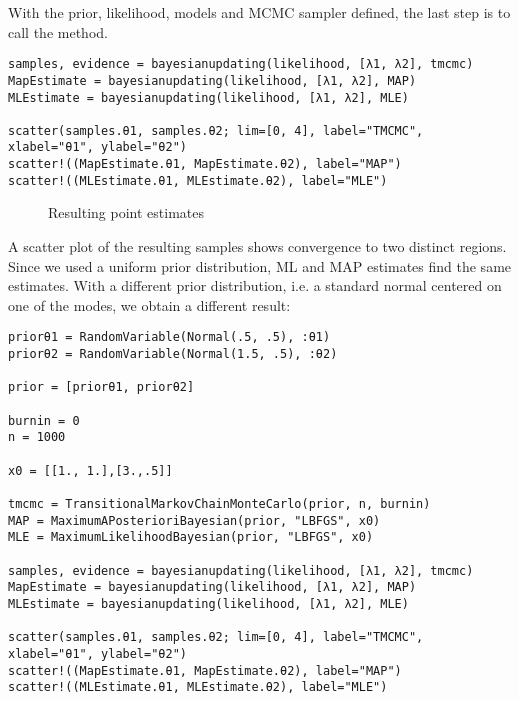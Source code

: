 With the prior, likelihood, models and  MCMC sampler defined, the last step is to call the  method.




\begin{verbatim}
samples, evidence = bayesianupdating(likelihood, [λ1, λ2], tmcmc)
MapEstimate = bayesianupdating(likelihood, [λ1, λ2], MAP)
MLEstimate = bayesianupdating(likelihood, [λ1, λ2], MLE)

scatter(samples.θ1, samples.θ2; lim=[0, 4], label="TMCMC", xlabel="θ1", ylabel="θ2")
scatter!((MapEstimate.θ1, MapEstimate.θ2), label="MAP")
scatter!((MLEstimate.θ1, MLEstimate.θ2), label="MLE")
\end{verbatim}



\begin{figure}
\centering
\caption{Resulting point estimates}
\end{figure}
  A scatter plot of the resulting samples shows convergence to two distinct regions. Since we used a uniform prior distribution, ML and MAP estimates find the same estimates. With a different prior distribution, i.e. a standard normal centered on one of the modes, we obtain a different result:




\begin{verbatim}
priorθ1 = RandomVariable(Normal(.5, .5), :θ1)
priorθ2 = RandomVariable(Normal(1.5, .5), :θ2)

prior = [priorθ1, priorθ2]

burnin = 0
n = 1000

x0 = [[1., 1.],[3.,.5]]

tmcmc = TransitionalMarkovChainMonteCarlo(prior, n, burnin)
MAP = MaximumAPosterioriBayesian(prior, "LBFGS", x0)
MLE = MaximumLikelihoodBayesian(prior, "LBFGS", x0)

samples, evidence = bayesianupdating(likelihood, [λ1, λ2], tmcmc)
MapEstimate = bayesianupdating(likelihood, [λ1, λ2], MAP)
MLEstimate = bayesianupdating(likelihood, [λ1, λ2], MLE)

scatter(samples.θ1, samples.θ2; lim=[0, 4], label="TMCMC", xlabel="θ1", ylabel="θ2")
scatter!((MapEstimate.θ1, MapEstimate.θ2), label="MAP")
scatter!((MLEstimate.θ1, MLEstimate.θ2), label="MLE")
\end{verbatim}



